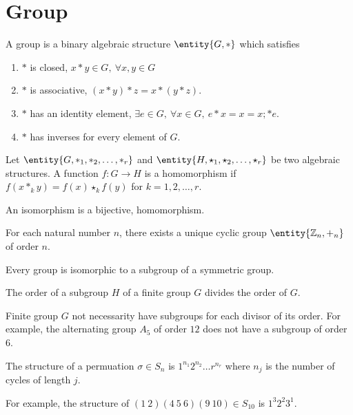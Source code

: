 \section{Group}
\begin{definition}[group]
	A group is a binary algebraic structure $\entity{G,\ast}$ which satisfies
	\begin{enumerate}
		\item $\ast$ is closed, $x \ast y \in G,\ \forall x,y \in G$
		\item $\ast$ is associative, $(x \ast y) \ast z = x \ast (y \ast z)$.
		\item $\ast$ has an identity element, $\exists e \in G,\ \forall x \in G,\ e \ast x = x = x ;\ast e$.
		\item $\ast$ has inverses for every element of $G$.
	\end{enumerate}
\end{definition}

\begin{definition}[homomorphism]
	Let $\entity{G,\ast_1,\ast_2,\dots,\ast_r}$ and $\entity{H,\star_1,\star_2,\dots,\star_r}$ be two algebraic structures.
	A function $f : G \to H$ is a homomorphism if $f(x \ast_k y) = f(x) \star_k f(y)$ for $k=1,2,\dots,r$.
\end{definition}

\begin{definition}[isomorphism]
	An isomorphism is a bijective, homomorphism.
\end{definition}

\begin{note}
	For each natural number $n$, there exists a unique cyclic group $\entity{\mathbb{Z}_n,+_n}$ of order $n$.
\end{note}

\begin{theorem}[Cayley]
	Every group is isomorphic to a subgroup of a symmetric group.
\end{theorem}

\begin{theorem}[Lagrange]
	The order of a subgroup $H$ of a finite group $G$  divides the order of $G$.
\end{theorem}
\begin{note}
	Finite group $G$ not necessarity have subgroups for each divisor of its order.
	For example, the alternating group $A_5$ of order $12$ does not have a subgroup of order $6$.
\end{note}

\begin{definition}[structure]
	The structure of a permuation $\sigma \in S_n$ is $1^{n_1} 2^{n_2} \dots r^{n_r}$ where $n_j$ is the number of cycles of length $j$.
\end{definition}
\begin{note}
	For example, the structure of $(1\ 2)(4\ 5\ 6)(9\ 10) \in S_{10}$ is $1^3 2^2 3^1$.
\end{note}
